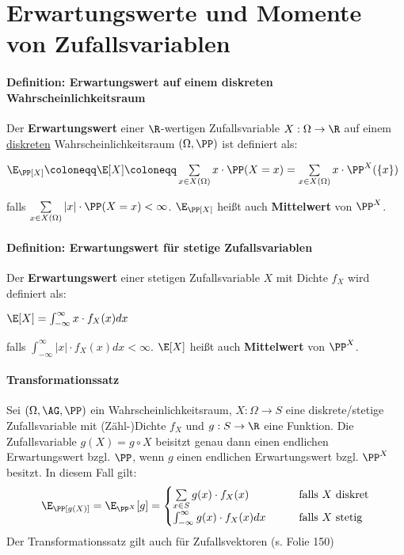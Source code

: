 \section{Erwartungswerte und Momente von Zufallsvariablen}
\paragraph{Definition: Erwartungswert auf einem diskreten Wahrscheinlichkeitsraum}
Der \textbf{Erwartungswert} einer $\R$-wertigen Zufallsvariable $X:\Omega\rightarrow\R$ auf einem \underline{diskreten} Wahrscheinlichkeitsraum $(\Omega,\PP)$ ist definiert als:
\begin{tightcenter}
	$\E_\PP[X]\coloneqq\E[X]\coloneqq\sum\limits_{x\in X(\Omega)}x\cdot \PP(X=x)=\sum\limits_{x\in X(\Omega)}x\cdot\PP^X(\{x\})$
\end{tightcenter}
falls $\sum\limits_{x\in X(\Omega)}|x|\cdot\PP(X=x)<\infty$.
$\E_\PP[X]$ heißt auch \textbf{Mittelwert} von $\PP^X$.

\paragraph{Definition: Erwartungswert für stetige Zufallsvariablen}
Der \textbf{Erwartungswert} einer stetigen Zufallsvariable $X$ mit Dichte $f_X$ wird definiert als:
\begin{tightcenter}
	$\E[X]=\int_{-\infty}^{\infty}x\cdot f_X(x)dx$
\end{tightcenter}
falls $\int_{-\infty}^{\infty}|x|\cdot f_X(x)dx<\infty$.
$\E[X]$ heißt auch \textbf{Mittelwert} von $\PP^X$.

\paragraph{Transformationssatz}
Sei $(\Omega,\AG,\PP)$ ein Wahrscheinlichkeitsraum, $X:\Omega\rightarrow S$ eine diskrete/stetige Zufallsvariable mit (Zähl-)Dichte $f_X$ und $g:S\rightarrow\R$ eine Funktion.
Die Zufallsvariable $g(X)=g\circ X$ beisitzt genau dann einen endlichen Erwartungswert bzgl. $\PP$, wenn $g$ einen endlichen Erwartungswert bzgl. $\PP^X$ besitzt.
In diesem Fall gilt:
\[   
\E_\PP[g(X)]=\E_{\PP^X}[g]=
\begin{cases}
	\sum\limits_{x\in S}g(x)\cdot f_X(x) & \qquad\text{falls $X$ diskret}\\
	\int_{-\infty}^{\infty}g(x)\cdot f_X(x)dx & \qquad\text{falls $X$ stetig}
\end{cases}
\]
Der Transformationssatz gilt auch für Zufallsvektoren (s. Folie 150)

